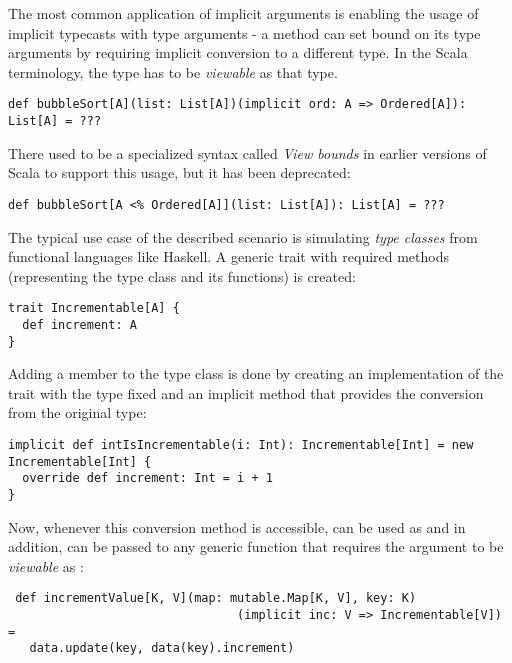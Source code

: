 The most common application of implicit arguments is enabling the usage of implicit typecasts with type arguments - a method can set bound on its type arguments by requiring implicit conversion to a different type. In the Scala terminology, the type has to be \textit{viewable} as that type.

\lstset{style=Scala}
\begin{lstlisting}
def bubbleSort[A](list: List[A])(implicit ord: A => Ordered[A]): List[A] = ???
\end{lstlisting}

There used to be a specialized syntax called \textit{View bounds} in earlier versions of Scala to support this usage, but it has been deprecated:

\lstset{style=Scala}
\begin{lstlisting}
def bubbleSort[A <% Ordered[A]](list: List[A]): List[A] = ???
\end{lstlisting}

The typical use case of the described scenario is simulating \textit{type classes} from functional languages like Haskell. A generic trait with required methods (representing the type class and its functions) is created:

\lstset{style=Scala}
\begin{lstlisting}
trait Incrementable[A] {
  def increment: A
}
\end{lstlisting}

 Adding a member to the type class is done by creating an implementation of the trait with the type fixed and an implicit method that provides the conversion from the original type:
 
 \lstset{style=Scala}
 \begin{lstlisting}
implicit def intIsIncrementable(i: Int): Incrementable[Int] = new Incrementable[Int] {
  override def increment: Int = i + 1
}
 \end{lstlisting}
 
 Now, whenever this conversion method is accessible,  can be used as  and in addition, can be passed to any generic function that requires the argument to be \textit{viewable} as :
 
  \lstset{style=Scala}
 \begin{lstlisting}
 def incrementValue[K, V](map: mutable.Map[K, V], key: K)
                                (implicit inc: V => Incrementable[V]) =
   data.update(key, data(key).increment)
  \end{lstlisting}
  
